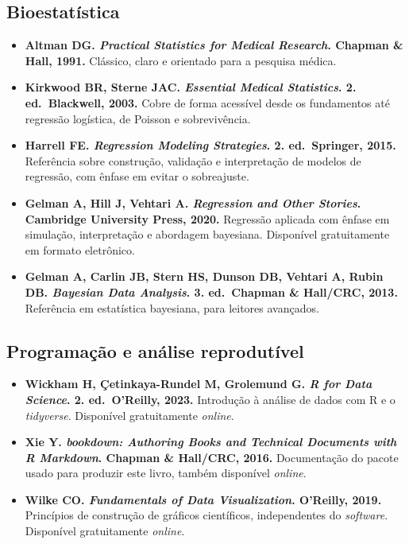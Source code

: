 \documentclass[
]{book}
\providecommand{\tightlist}{%
  \setlength{\itemsep}{0pt}\setlength{\parskip}{0pt}}
\begin{document}
\subsection{Bioestatística}\label{bioestatuxedstica}

\begin{itemize}
\tightlist
\item
  \textbf{Altman DG. \emph{Practical Statistics for Medical Research}. Chapman \& Hall, 1991.} Clássico, claro e orientado para a pesquisa médica.
\item
  \textbf{Kirkwood BR, Sterne JAC. \emph{Essential Medical Statistics}. 2. ed.~Blackwell, 2003.} Cobre de forma acessível desde os fundamentos até regressão logística, de Poisson e sobrevivência.
\item
  \textbf{Harrell FE. \emph{Regression Modeling Strategies}. 2. ed.~Springer, 2015.} Referência sobre construção, validação e interpretação de modelos de regressão, com ênfase em evitar o sobreajuste.
\item
  \textbf{Gelman A, Hill J, Vehtari A. \emph{Regression and Other Stories}. Cambridge University Press, 2020.} Regressão aplicada com ênfase em simulação, interpretação e abordagem bayesiana. Disponível gratuitamente em formato eletrônico.
\item
  \textbf{Gelman A, Carlin JB, Stern HS, Dunson DB, Vehtari A, Rubin DB. \emph{Bayesian Data Analysis}. 3. ed.~Chapman \& Hall/CRC, 2013.} Referência em estatística bayesiana, para leitores avançados.
\end{itemize}

\subsection{Programação e análise reprodutível}\label{programauxe7uxe3o-e-anuxe1lise-reprodutuxedvel}

\begin{itemize}
\tightlist
\item
  \textbf{Wickham H, Çetinkaya-Rundel M, Grolemund G. \emph{R for Data Science}. 2. ed.~O'Reilly, 2023.} Introdução à análise de dados com R e o \emph{tidyverse}. Disponível gratuitamente \emph{online}.
\item
  \textbf{Xie Y. \emph{bookdown: Authoring Books and Technical Documents with R Markdown}. Chapman \& Hall/CRC, 2016.} Documentação do pacote usado para produzir este livro, também disponível \emph{online}.
\item
  \textbf{Wilke CO. \emph{Fundamentals of Data Visualization}. O'Reilly, 2019.} Princípios de construção de gráficos científicos, independentes do \emph{software}. Disponível gratuitamente \emph{online}.
\end{itemize}
\end{document}
